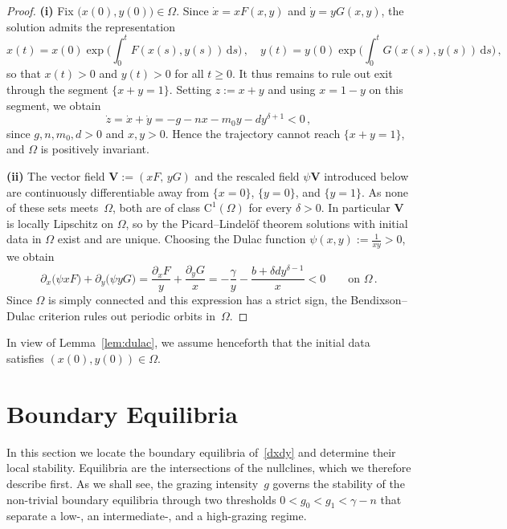 \documentclass[reqno,11pt]{amsart}
\numberwithin{equation}{section}
\newcommand{\rd}{\mathrm{d}}
\begin{document}
\begin{proof}
{\bf (i)} Fix $\big(x(0),y(0)\big)\in\Omega$. Since $\dot x=xF(x,y)$ and $\dot y=yG(x,y)$, the solution admits the representation
\[
x(t)=x(0)\exp\Big(\int_0^t F(x(s),y(s))\,\rd s\Big)\,,\quad
y(t)=y(0)\exp\Big(\int_0^t G(x(s),y(s))\,\rd s\Big)\,,
\]
so that $x(t)>0$ and $y(t)>0$ for all $t\ge0$. It thus remains to rule out exit through the segment $\{x+y=1\}$. Setting $z:=x+y$ and using $x=1-y$ on this segment, we obtain
\begin{equation}\label{zdot}
\dot z=\dot x+\dot y=-g-nx-m_0y-dy^{\delta+1}<0\,,
\end{equation}
since $g,n,m_0,d>0$ and $x,y>0$. Hence the trajectory cannot reach $\{x+y=1\}$, and $\Omega$ is positively invariant.

{\bf (ii)} The vector field $\mathbf V:=(xF,\,yG)$ and the rescaled field $\psi\mathbf V$ introduced below are continuously differentiable away from $\{x=0\}$, $\{y=0\}$, and $\{y=1\}$. As none of these sets meets~$\Omega$, both are of class $\mathrm{C}^1(\Omega)$ for every $\delta>0$. In particular $\mathbf V$ is locally Lipschitz on $\Omega$, so by the Picard--Lindel\"of theorem solutions with initial data in $\Omega$ exist and are unique. Choosing the Dulac function $\psi(x,y):=\tfrac{1}{xy}>0$, we obtain
\[
\partial_x\big(\psi x F\big)+\partial_y\big(\psi y G\big)
=\frac{\partial_x F}{y}+\frac{\partial_y G}{x}
=-\frac{\gamma}{y}-\frac{b+\delta dy^{\delta-1}}{x}<0
\qquad\text{on }\Omega\,.
\]
Since $\Omega$ is simply connected and this expression has a strict sign, the Bendixson--Dulac criterion rules out periodic orbits in~$\Omega$.
\end{proof}

In view of Lemma~\ref{lem:dulac}, we assume henceforth that the initial data satisfies $(x(0),y(0))\in\Omega$.

\bigskip

\section{Boundary Equilibria}\label{sec:boundary}

In this section we locate the boundary equilibria of~\eqref{dxdy} and determine their local stability. Equilibria are the intersections of the nullclines, which we therefore describe first. As we shall see, the grazing intensity~$g$ governs the stability of the non-trivial boundary equilibria through two thresholds $0<g_0<g_1<\gamma-n$ that separate a low-, an intermediate-, and a high-grazing regime.
\end{document}
